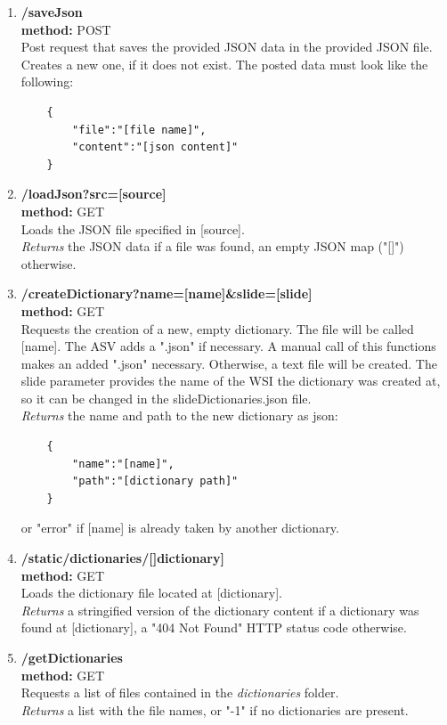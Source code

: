 \begin{enumerate}[(1) -]
	\item \textbf{/saveJson\\
	method:} POST\\
	Post request that saves the provided JSON data in the provided JSON file. Creates a new one, if it does not exist. The posted data must look like the following:
	\begin{lstlisting}
	{
		"file":"[file name]",
		"content":"[json content]"
	}
	\end{lstlisting}
		
	\item \textbf{/loadJson?src=[source]\\
	method:} GET\\
	Loads the JSON file specified in [source].\\
	\emph{Returns} the JSON data if a file was found, an empty JSON map ("[]") otherwise.
	
	\item \textbf{/createDictionary?name=[name]\&slide=[slide]\\
	method:} GET\\
	Requests the creation of a new, empty dictionary. The file will be called [name]. The ASV adds a ".json" if necessary. A manual call of this functions makes an added ".json" necessary. Otherwise, a text file will be created. The slide parameter provides the name of the WSI the dictionary was created at, so it can be changed in the slideDictionaries.json file. \\
	\emph{Returns} the name and path to the new dictionary as json:
	\begin{lstlisting}
	{
		"name":"[name]",
		"path":"[dictionary path]"
	}
	\end{lstlisting}
	or "error" if [name] is already taken by another dictionary.
	
	\item \textbf{/static/dictionaries/[]dictionary]\\
		method:} GET\\
	Loads the dictionary file located at [dictionary]. \\
	\emph{Returns} a stringified version of the dictionary content if a dictionary was found at [dictionary], a "404 Not Found" HTTP status code otherwise.
	
	\item \textbf{/getDictionaries\\
	method:} GET\\
	Requests a list of files contained in the \emph{dictionaries} folder.\\
	\emph{Returns} a list with the file names, or "-1" if no dictionaries are present.
	

\end{enumerate}
